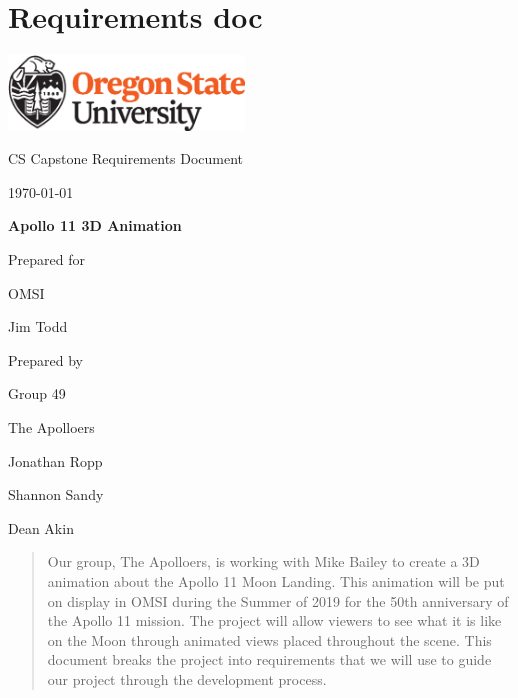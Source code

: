 \documentclass[onecolumn, draftclsnofoot,10pt, compsoc]{IEEEtran}
\def \CapstoneTeamName{		    The Apolloers}
\def \CapstoneTeamNumber{		49}
\def \GroupMemberOne{			Jonathan Ropp}
\def \GroupMemberTwo{			Shannon Sandy}
\def \GroupMemberThree{			Dean Akin}
\def \CapstoneProjectName{		Apollo 11 3D Animation}
\def \CapstoneSponsorCompany{	OMSI}
\def \CapstoneSponsorPersona{	Jim Todd}
\newcommand{\NameSigPair}[1]{\par
\makebox[2.75in][r]{#1} \hfil 	\makebox[3.25in]{\makebox[2.25in]{\hrulefill} \hfill		\makebox[.75in]{\hrulefill}}
\par\vspace{-12pt} \textit{\tiny\noindent
\makebox[2.75in]{} \hfil		\makebox[3.25in]{\makebox[2.25in][r]{Signature} \hfill	\makebox[.75in][r]{Date}}}}
\renewcommand{\NameSigPair}[1]{#1}
\begin{document}
\section{Requirements doc}
\begin{titlepage}
    \begin{singlespace}
        \hfill 
        \includegraphics[height=2cm]{OSU_horizontal_2C_O_over_B.eps}   
        \par\vspace{.2in}
        \centering
        \scshape{
            \huge CS Capstone Requirements Document \par
            {\large\today}\par
            \vspace{.5in}
            \textbf{\Huge\CapstoneProjectName}\par
            \vfill
            {\large Prepared for}\par
            \Huge \CapstoneSponsorCompany\par
            \vspace{5pt}
            {\Large\NameSigPair{\CapstoneSponsorPersona}\par}
            {\large Prepared by }\par
            Group\CapstoneTeamNumber\par
            \CapstoneTeamName\par 
            \vspace{5pt}
            {\Large
                \NameSigPair{\GroupMemberOne}\par
                \NameSigPair{\GroupMemberTwo}\par
                \NameSigPair{\GroupMemberThree}\par
            }
            \vspace{20pt}
        }
        \begin{abstract}
        	Our group, The Apolloers, is working with Mike Bailey to create a 3D animation about the Apollo 11 Moon Landing. This animation will be put on display in OMSI during the Summer of 2019 for the 50th anniversary of the Apollo 11 mission. The project will allow viewers to see what it is like on the Moon through animated views placed throughout the scene. This document breaks the project into requirements that we will use to guide our project through the development process. 
        \end{abstract}     
    \end{singlespace}
\end{titlepage}
\newpage
{}
\end{document}
